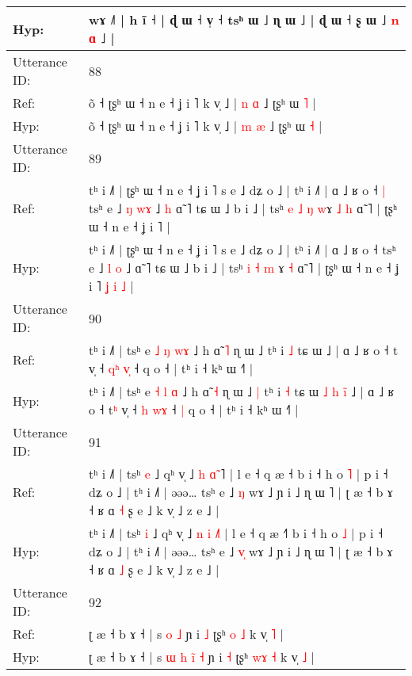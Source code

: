 \documentclass[10pt]{article}
\DeclareRobustCommand{\hl}[1]{{\textcolor{red}{#1}}}
\begin{document}
\begin{longtable}{ll}
 \\
Hyp: & wɤ ˩˥ | h ĩ ˧ | ɖ ɯ ˧ v̩ ˧ tsʰ ɯ ˩ ɳ ɯ ˩ | ɖ ɯ ˧ ʂ ɯ ˩ \hl{n} \hl{}\hl{ɑ} ˩ |
 \\
\midrule
Utterance ID: & 88 \\
Ref: & õ ˧ ʈʂʰ ɯ ˧ n e ˧ ʝ i ˥ k v̩ ˩ | \hl{n} \hl{ɑ} ˩ ʈʂʰ ɯ \hl{˥} |
 \\
Hyp: & õ ˧ ʈʂʰ ɯ ˧ n e ˧ ʝ i ˥ k v̩ ˩ | \hl{m} \hl{æ} ˩ ʈʂʰ ɯ \hl{˧} |
 \\
\midrule
Utterance ID: & 89 \\
Ref: & tʰ i ˩˥ | ʈʂʰ ɯ ˧ n e ˧ ʝ i ˥ s e ˩ dʑ o ˩ | tʰ i ˩˥ | ɑ ˩ ʁ o ˧\hl{ }\hl{|} tsʰ e ˩ \hl{ŋ} \hl{w}\hl{ɤ} ˩\hl{ }\hl{h} ɑ̃ ˥ tɕ ɯ ˩ b i ˩ | tsʰ \hl{e} \hl{˩} \hl{ŋ} \hl{w}ɤ\hl{ }\hl{˩} \hl{h} ɑ̃ ˥ | ʈʂʰ ɯ ˧ n e ˧ ʝ i ˥\hl{}\hl{}\hl{}\hl{}\hl{}\hl{} |
 \\
Hyp: & tʰ i ˩˥ | ʈʂʰ ɯ ˧ n e ˧ ʝ i ˥ s e ˩ dʑ o ˩ | tʰ i ˩˥ | ɑ ˩ ʁ o ˧\hl{}\hl{} tsʰ e ˩ \hl{l} \hl{}\hl{o} ˩\hl{}\hl{} ɑ̃ ˥ tɕ ɯ ˩ b i ˩ | tsʰ \hl{i} \hl{˧} \hl{m} \hl{}ɤ\hl{}\hl{} \hl{˧} ɑ̃ ˥ | ʈʂʰ ɯ ˧ n e ˧ ʝ i ˥\hl{ }\hl{ʝ}\hl{ }\hl{i}\hl{ }\hl{˩} |
 \\
\midrule
Utterance ID: & 90 \\
Ref: & tʰ i ˩˥ | tsʰ e \hl{˩} \hl{ŋ} \hl{w}\hl{ɤ} ˩ h ɑ̃ \hl{˥} ɳ ɯ ˩\hl{}\hl{} tʰ i \hl{˩} tɕ ɯ\hl{}\hl{}\hl{}\hl{}\hl{}\hl{}\hl{} ˩ | ɑ ˩ ʁ o ˧ t\hl{} v̩ ˧ \hl{q}\hl{ʰ} \hl{v}\hl{̩} ˧\hl{}\hl{} q o ˧ | tʰ i ˧ kʰ ɯ ˧˥ |
 \\
Hyp: & tʰ i ˩˥ | tsʰ e \hl{˧} \hl{l} \hl{}\hl{ɑ} ˩ h ɑ̃ \hl{˧} ɳ ɯ ˩\hl{ }\hl{|} tʰ i \hl{˧} tɕ ɯ\hl{ }\hl{˩}\hl{ }\hl{h}\hl{ }\hl{i}\hl{̃} ˩ | ɑ ˩ ʁ o ˧ t\hl{ʰ} v̩ ˧ \hl{}\hl{h} \hl{w}\hl{ɤ} ˧\hl{ }\hl{|} q o ˧ | tʰ i ˧ kʰ ɯ ˧˥ |
 \\
\midrule
Utterance ID: & 91 \\
Ref: & tʰ i ˩˥ | tsʰ \hl{e} ˩ qʰ v̩ ˩ \hl{h} \hl{ɑ}\hl{̃}\hl{ }˥ | l e ˧ q æ ˧\hl{} b i ˧ h o \hl{˥} | p i ˧ dʑ o ˩ | tʰ i ˩˥ | əəə… tsʰ e ˩ \hl{}\hl{ŋ} wɤ ˩ ɲ i ˩ ɳ ɯ ˥ | ʈ æ ˧ b ɤ ˧ ʁ ɑ \hl{˧} ʂ e ˩ k v̩ ˩ z e ˩ |
 \\
Hyp: & tʰ i ˩˥ | tsʰ \hl{i} ˩ qʰ v̩ ˩ \hl{n} \hl{i}\hl{ }\hl{˩}˥ | l e ˧ q æ ˧\hl{˥} b i ˧ h o \hl{˩} | p i ˧ dʑ o ˩ | tʰ i ˩˥ | əəə… tsʰ e ˩ \hl{v}\hl{̩} wɤ ˩ ɲ i ˩ ɳ ɯ ˥ | ʈ æ ˧ b ɤ ˧ ʁ ɑ \hl{˩} ʂ e ˩ k v̩ ˩ z e ˩ |
 \\
\midrule
Utterance ID: & 92 \\
Ref: & ʈ æ ˧ b ɤ ˧ | s\hl{}\hl{}\hl{}\hl{} \hl{}\hl{o} \hl{˩} ɲ i \hl{˩} ʈʂʰ \hl{}\hl{o} \hl{˩} k v̩ \hl{˥} |
 \\
Hyp: & ʈ æ ˧ b ɤ ˧ | s\hl{ }\hl{ɯ}\hl{ }\hl{h} \hl{i}\hl{̃} \hl{˧} ɲ i \hl{˧} ʈʂʰ \hl{w}\hl{ɤ} \hl{˧} k v̩ \hl{˩} |

\end{longtable}
\end{document}
